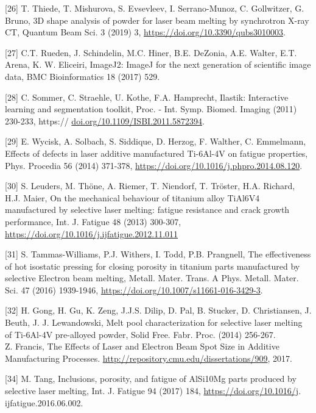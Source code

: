 \documentclass[10pt]{article}
\begin{document}
[26] T. Thiede, T. Mishurova, S. Evsevleev, I. Serrano-Munoz, C. Gollwitzer, G. Bruno, 3D shape analysis of powder for laser beam melting by synchrotron X-ray CT, Quantum Beam Sci. 3 (2019) 3, \href{https://doi.org/10.3390/qubs3010003}{https://doi.org/10.3390/qubs3010003}.

[27] C.T. Rueden, J. Schindelin, M.C. Hiner, B.E. DeZonia, A.E. Walter, E.T. Arena, K. W. Eliceiri, ImageJ2: ImageJ for the next generation of scientific image data, BMC Bioinformatics 18 (2017) 529.

[28] C. Sommer, C. Straehle, U. Kothe, F.A. Hamprecht, Ilastik: Interactive learning and segmentation toolkit, Proc. - Int. Symp. Biomed. Imaging (2011) 230-233, https:// \href{http://doi.org/10.1109/ISBI.2011.5872394}{doi.org/10.1109/ISBI.2011.5872394}.

[29] E. Wycisk, A. Solbach, S. Siddique, D. Herzog, F. Walther, C. Emmelmann, Effects of defects in laser additive manufactured Ti-6Al-4V on fatigue properties, Phys. Procedia 56 (2014) 371-378, \href{https://doi.org/10.1016/j.phpro.2014.08.120}{https://doi.org/10.1016/j.phpro.2014.08.120}.

[30] S. Leuders, M. Thöne, A. Riemer, T. Niendorf, T. Tröster, H.A. Richard, H.J. Maier, On the mechanical behaviour of titanium alloy TiAl6V4 manufactured by selective laser melting: fatigue resistance and crack growth performance, Int. J. Fatigue 48 (2013) 300-307, \href{https://doi.org/10.1016/j.ijfatigue.2012.11.011}{https://doi.org/10.1016/j.ijfatigue.2012.11.011}

[31] S. Tammas-Williams, P.J. Withers, I. Todd, P.B. Prangnell, The effectiveness of hot isostatic pressing for closing porosity in titanium parts manufactured by selective Electron beam melting, Metall. Mater. Trans. A Phys. Metall. Mater. Sci. 47 (2016) 1939-1946, \href{https://doi.org/10.1007/s11661-016-3429-3}{https://doi.org/10.1007/s11661-016-3429-3}.

[32] H. Gong, H. Gu, K. Zeng, J.J.S. Dilip, D. Pal, B. Stucker, D. Christiansen, J. Beuth, J. J. Lewandowski, Melt pool characterization for selective laser melting of Ti-6Al-4V pre-alloyed powder, Solid Free. Fabr. Proc. (2014) 256-267.\\
[33] Z. Francis, The Effects of Laser and Electron Beam Spot Size in Additive Manufacturing Processes. \href{http://repository.cmu.edu/dissertations/909}{http://repository.cmu.edu/dissertations/909}, 2017.

[34] M. Tang, Inclusions, porosity, and fatigue of AlSi10Mg parts produced by selective laser melting, Int. J. Fatigue 94 (2017) 184, \href{https://doi.org/10.1016/j}{https://doi.org/10.1016/j}. ijfatigue.2016.06.002.
\end{document}
